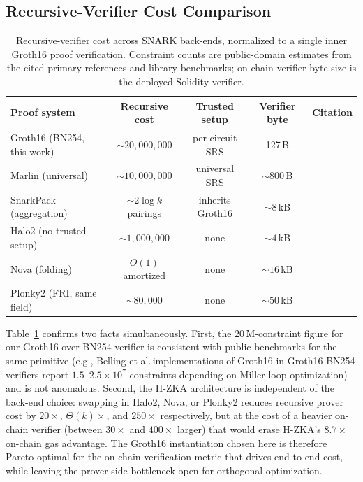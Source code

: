 \documentclass[journal]{IEEEtran}
\begin{document}
\subsection{Recursive-Verifier Cost Comparison}
\label{sec:recursivecmp}

\begin{table}[t]
\centering
\caption{Recursive-verifier cost across SNARK back-ends, normalized to a single inner Groth16 proof verification. Constraint counts are public-domain estimates from the cited primary references and library benchmarks; on-chain verifier byte size is the deployed Solidity verifier.}
\label{tab:recursivecmp}
\begin{tabular}{lcccc}
\toprule
Proof system & Recursive cost & Trusted setup & Verifier byte & Citation \\
\midrule
Groth16 (BN254, this work) & $\sim 20{,}000{,}000$ & per-circuit SRS & 127\,B & \cite{groth2016size} \\
Marlin (universal) & $\sim 10{,}000{,}000$ & universal SRS & $\sim 800$\,B & \cite{chiesa2020marlin} \\
SnarkPack (aggregation) & $\sim 2 \log k$ pairings & inherits Groth16 & $\sim 8$\,kB & \cite{bunz2021snarkpack} \\
Halo2 (no trusted setup) & $\sim 1{,}000{,}000$ & none & $\sim 4$\,kB & \cite{bowe2019halo} \\
Nova (folding) & $O(1)$ amortized & none & $\sim 16$\,kB & \cite{kothapalli2022nova} \\
Plonky2 (FRI, same field) & $\sim 80{,}000$ & none & $\sim 50$\,kB & \cite{plonky2} \\
\bottomrule
\end{tabular}
\end{table}

Table~\ref{tab:recursivecmp} confirms two facts simultaneously. First, the $20\,$M-constraint figure for our Groth16-over-BN254 verifier is consistent with public benchmarks for the same primitive (e.g., Belling et al.\,implementations of Groth16-in-Groth16 BN254 verifiers report $1.5$--$2.5\times 10^7$ constraints depending on Miller-loop optimization) and is not anomalous. Second, the H-ZKA architecture is independent of the back-end choice: swapping in Halo2, Nova, or Plonky2 reduces recursive prover cost by $20\times$, $\Theta(k)\times$, and $250\times$ respectively, but at the cost of a heavier on-chain verifier (between $30\times$ and $400\times$ larger) that would erase H-ZKA's $8.7\times$ on-chain gas advantage. The Groth16 instantiation chosen here is therefore Pareto-optimal for the on-chain verification metric that drives end-to-end cost, while leaving the prover-side bottleneck open for orthogonal optimization.
\end{document}
